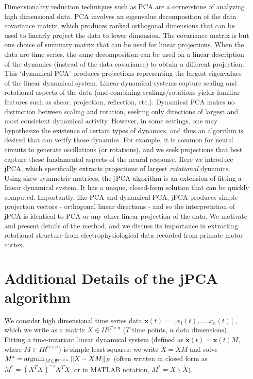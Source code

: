 \documentclass[12pt]{article}%
\def\x{{\mathbf x}}
\newcommand{\reals}{I\!\!R} %
\def\argmin{\qopname\relax n{argmin}}
\begin{document}
%
Dimensionality reduction techniques such as PCA are a cornerstone of analyzing high dimensional data.   PCA involves an eigenvalue decomposition of the data covariance matrix, which produces ranked orthogonal dimensions that can be used to linearly project the data to lower dimension.  The covariance matrix is but one choice of summary matrix that can be used for linear projections.   When the data are time series, the same decomposition can be used on a linear description of the dynamics (instead of the data covariance) to obtain a different projection.  This `dynamical PCA' produces projections representing the largest eigenvalues of the linear dynamical system.  Linear dynamical systems capture scaling and rotational aspects of the data (and combining scalings/rotations yields familiar features such as shear, projection, reflection, etc.).  Dynamical PCA makes no distinction between scaling and rotation, seeking only directions of largest and most consistent dynamical activity.  However, in some settings, one may hypothesize the existence of certain types of dynamics, and thus an algorithm is desired that can verify those dynamics.  For example, it is common for neural circuits to generate oscillations (or rotations), and we seek projections that best capture these fundamental aspects of the neural response.  Here we introduce jPCA, which specifically extracts projections of largest \emph{rotational} dynamics.   Using skew-symmetric matrices, the jPCA algorithm is an extension of fitting a linear dynamical system.  It has a unique, closed-form solution that can be quickly computed.  Importantly, like PCA and dynamical PCA, jPCA produces simple projection vectors - orthogonal linear directions - and so the interpretation of jPCA is identical to PCA or any other linear projection of the data.  We motivate and present details of the method, and we discuss its importance in extracting rotational structure from electrophysiological data recorded from primate motor cortex.
%
%
\section*{Additional Details of the jPCA algorithm}
%
We consider high dimensional time series data $\x(t) = [x_1(t),...,x_n(t)]$, which we write as a matrix $X \in \reals^{T \times n}$ ($T$ time points, $n$ data dimensions).  Fitting a time-invariant linear dynamical system (defined as $\dot\x(t) = \x(t)M$, where $M\in\reals^{n \times n}$) is simple least squares: we write $\dot X = XM$ and solve $M^* = \argmin_{M \in \reals^{n \times n}} || \dot X - XM ||_F$ (often written in closed form as $M^* =  (X^TX)^{-1}X^T\dot X$, or in MATLAB notation,  $M^* = X\backslash\dot X$).
\end{document}
